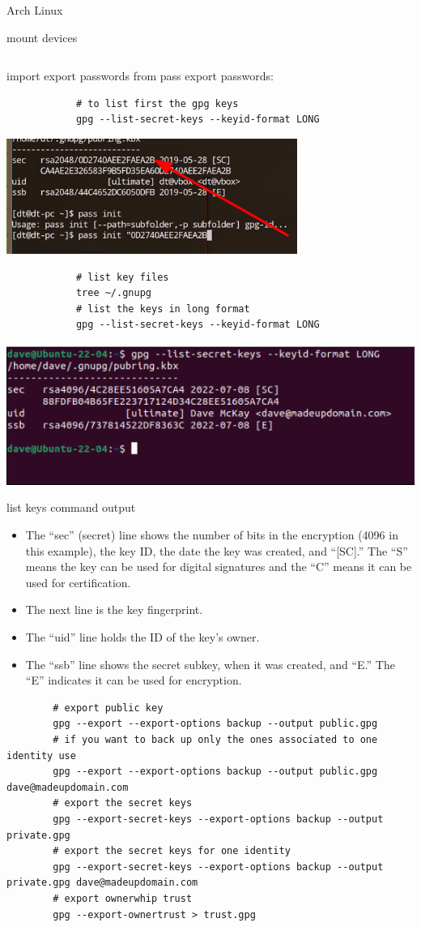 \begin{section}{Arch Linux}
\begin{subsection}{mount devices}
\begin{verbatim}
		\end{verbatim}
	\end{subsection}
	\newpage
	\begin{subsection}{import export passwords from pass}
		export passwords:
		\begin{verbatim}
			# to list first the gpg keys
			gpg --list-secret-keys --keyid-format LONG
		\end{verbatim}
		\includegraphics{img_ArchLinux/publicKeyImage.png}
		\begin{verbatim}
			# list key files
			tree ~/.gnupg
			# list the keys in long format
			gpg --list-secret-keys --keyid-format LONG
		\end{verbatim}
		\includegraphics{img_ArchLinux/list_keys_image.png}
		\caption{list keys command output}
	\begin{itemize}
		\item
			The “sec” (secret) line shows the number of bits in the encryption (4096 in this example), the key ID, the date the key was created, and “[SC].” The “S” means the key can be used for digital signatures and the “C” means it can be used for certification.

		\item 
			The next line is the key fingerprint.
		\item
			The “uid” line holds the ID of the key’s owner.
		\item
			The “ssb” line shows the secret subkey, when it was created, and “E.” The “E” indicates it can be used for encryption.
	\end{itemize}

	\begin{verbatim}
		# export public key
		gpg --export --export-options backup --output public.gpg
		# if you want to back up only the ones associated to one identity use
		gpg --export --export-options backup --output public.gpg dave@madeupdomain.com
		# export the secret keys
		gpg --export-secret-keys --export-options backup --output private.gpg
		# export the secret keys for one identity
		gpg --export-secret-keys --export-options backup --output private.gpg dave@madeupdomain.com
		# export ownerwhip trust
		gpg --export-ownertrust > trust.gpg
		


\end{verbatim}
\end{subsection}
\end{section}
